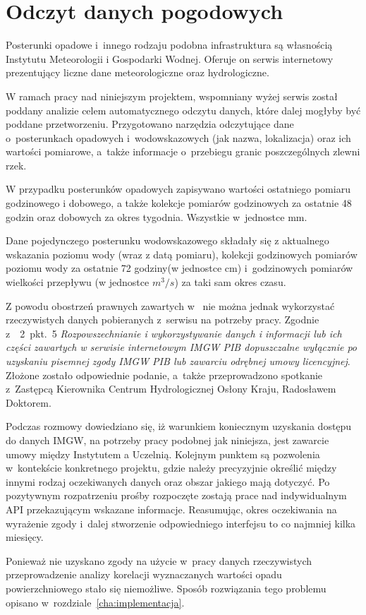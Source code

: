 \chapter{Odczyt danych pogodowych}
\label{cha:odczyt_danych}
Posterunki opadowe i~innego rodzaju podobna infrastruktura są własnością Instytutu Meteorologii i Gospodarki Wodnej. Oferuje on serwis internetowy~\cite{pogodynka_pl} prezentujący liczne dane meteorologiczne oraz hydrologiczne.

W ramach pracy nad niniejszym projektem, wspomniany wyżej serwis został poddany analizie celem automatycznego odczytu danych, które dalej mogłyby być poddane przetworzeniu. Przygotowano narzędzia odczytujące dane o~posterunkach opadowych i~wodowskazowych (jak nazwa, lokalizacja) oraz ich wartości pomiarowe, a~także informacje o~przebiegu granic poszczególnych zlewni rzek.

W przypadku posterunków opadowych zapisywano wartości ostatniego pomiaru godzinowego i dobowego, a także kolekcje pomiarów godzinowych za ostatnie 48 godzin oraz dobowych za okres tygodnia. Wszystkie w~jednostce mm.

Dane pojedynczego posterunku wodowskazowego składały się z aktualnego wskazania poziomu wody (wraz z datą pomiaru), kolekcji godzinowych pomiarów poziomu wody za ostatnie 72 godziny(w jednostce cm) i~godzinowych pomiarów wielkości przepływu (w jednostce $m^3/s$) za taki sam okres czasu.


Z powodu obostrzeń prawnych zawartych w~\cite{pogodynka_prawo} nie można jednak wykorzystać rzeczywistych danych pobieranych z~serwisu na potrzeby pracy. Zgodnie z~\textsection~2~pkt.~5 \textit{Rozpowszechnianie i wykorzystywanie danych i informacji lub ich części zawartych w serwisie internetowym IMGW PIB dopuszczalne wyłącznie po uzyskaniu pisemnej zgody IMGW PIB lub zawarciu odrębnej umowy licencyjnej}. Złożone zostało odpowiednie podanie, a~także przeprowadzono spotkanie z~Zastępcą Kierownika Centrum Hydrologicznej Osłony Kraju, Radosławem Doktorem.

Podczas rozmowy dowiedziano się, iż warunkiem koniecznym uzyskania dostępu do danych IMGW, na potrzeby pracy podobnej jak niniejsza, jest zawarcie umowy między Instytutem a Uczelnią. Kolejnym punktem są pozwolenia w~kontekście konkretnego projektu, gdzie należy precyzyjnie określić między innymi rodzaj oczekiwanych danych oraz obszar jakiego mają dotyczyć. Po pozytywnym rozpatrzeniu prośby rozpoczęte zostają prace nad indywidualnym API przekazującym wskazane informacje. Reasumując, okres oczekiwania na wyrażenie zgody i~dalej stworzenie odpowiedniego interfejsu to co najmniej kilka miesięcy.

Ponieważ nie uzyskano zgody na użycie w~pracy danych rzeczywistych przeprowadzenie analizy korelacji wyznaczanych wartości opadu powierzchniowego stało się niemożliwe. Sposób rozwiązania tego problemu opisano w~rozdziale~\ref{cha:implementacja}.